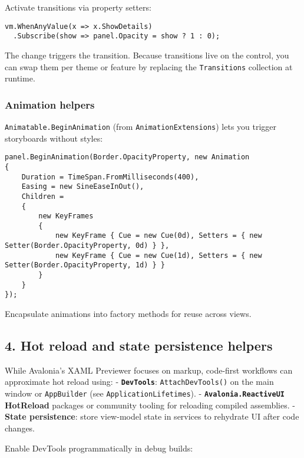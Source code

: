 Activate transitions via property setters:

\begin{lstlisting}
vm.WhenAnyValue(x => x.ShowDetails)
  .Subscribe(show => panel.Opacity = show ? 1 : 0);
\end{lstlisting}

The change triggers the transition. Because transitions live on the
control, you can swap them per theme or feature by replacing the
\passthrough{\lstinline!Transitions!} collection at runtime.

\subsubsection{Animation helpers}\label{animation-helpers}

\passthrough{\lstinline!Animatable.BeginAnimation!} (from
\passthrough{\lstinline!AnimationExtensions!}) lets you trigger
storyboards without styles:

\begin{lstlisting}
panel.BeginAnimation(Border.OpacityProperty, new Animation
{
    Duration = TimeSpan.FromMilliseconds(400),
    Easing = new SineEaseInOut(),
    Children =
    {
        new KeyFrames
        {
            new KeyFrame { Cue = new Cue(0d), Setters = { new Setter(Border.OpacityProperty, 0d) } },
            new KeyFrame { Cue = new Cue(1d), Setters = { new Setter(Border.OpacityProperty, 1d) } }
        }
    }
});
\end{lstlisting}

Encapsulate animations into factory methods for reuse across views.

\subsection{4. Hot reload and state persistence
helpers}\label{hot-reload-and-state-persistence-helpers}

While Avalonia's XAML Previewer focuses on markup, code-first workflows
can approximate hot reload using: -
\textbf{\passthrough{\lstinline!DevTools!}}:
\passthrough{\lstinline!AttachDevTools()!} on the main window or
\passthrough{\lstinline!AppBuilder!} (see
\passthrough{\lstinline!ApplicationLifetimes!}). -
\textbf{\passthrough{\lstinline!Avalonia.ReactiveUI!} HotReload}
packages or community tooling for reloading compiled assemblies. -
\textbf{State persistence}: store view-model state in services to
rehydrate UI after code changes.

Enable DevTools programmatically in debug builds:

